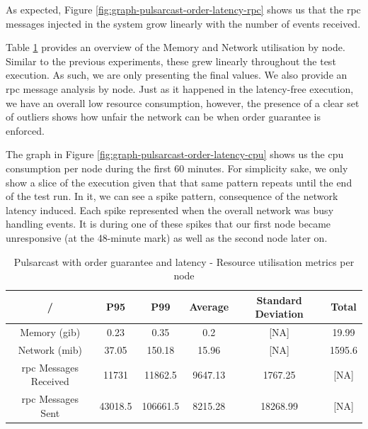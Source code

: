 As expected, Figure \ref{fig:graph-pulsarcast-order-latency-rpc} shows us that
the \acrshort{rpc} messages injected in the system grow linearly with the number of events
received.

Table \ref{table:pulsarcast-order-latency} provides an overview of the Memory
and Network utilisation by node. Similar to the previous experiments, these
grew linearly throughout the test execution. As such, we are only presenting
the final values. We also provide an \acrshort{rpc} message analysis by node. Just as it
happened in the latency-free execution, we have an overall low resource
consumption, however, the presence of a clear set of outliers shows how unfair
the network can be when order guarantee is enforced.

The graph in Figure \ref{fig:graph-pulsarcast-order-latency-cpu} shows us the
\acrshort{cpu} consumption per node during the first 60 minutes. For simplicity
sake, we only show a slice of the execution given that that same pattern
repeats until the end of the test run. In it, we can see a spike pattern,
consequence of the network latency induced. Each spike represented when the
overall network was busy handling events. It is during one of these spikes that
our first node became unresponsive (at the 48-minute mark) as well as the
second node later on.

\begin{table}[!htb]
\caption{Pulsarcast with order guarantee and latency - Resource utilisation metrics per node}
\label{table:pulsarcast-order-latency}
  \begin{center}
   \begin{tabular}{|c| c c c c c|} 
   \hline
   / & P95 & P99 & Average & Standard Deviation & Total \\ [0.5ex] 
   \hline\hline
   Memory (\acrshort{gib}) & 0.23 & 0.35 & 0.2 & [NA] & 19.99 \\
   \hline
   Network (\acrshort{mib}) & 37.05 & 150.18 & 15.96 & [NA] & 1595.6 \\
   \hline
   \acrshort{rpc} Messages Received & 11731 & 11862.5 & 9647.13 & 1767.25 & [NA] \\
   \hline
   \acrshort{rpc} Messages Sent & 43018.5 & 106661.5 & 8215.28 & 18268.99 & [NA] \\ [1ex] 
   \hline
  \end{tabular}
  \end{center}
\end{table}

